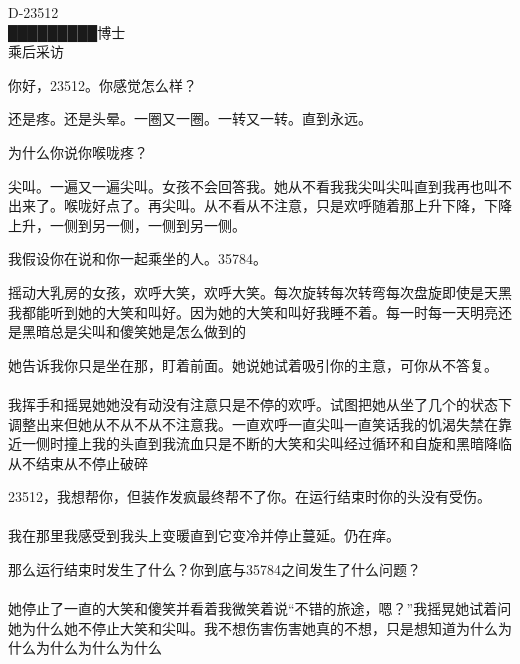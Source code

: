 


\begin{scpbox}

D-23512\\
█████████博士\\
乘后采访\\

你好，23512。你感觉怎么样？

还是疼。还是头晕。一圈又一圈。一转又一转。直到永远。

为什么你说你喉咙疼？

尖叫。一遍又一遍尖叫。女孩不会回答我。她从不看我我尖叫尖叫直到我再也叫不出来了。喉咙好点了。再尖叫。从不看从不注意，只是欢呼随着那上升下降，下降上升，一侧到另一侧，一侧到另一侧。

我假设你在说和你一起乘坐的人。35784。

摇动大乳房的女孩，欢呼大笑，欢呼大笑。每次旋转每次转弯每次盘旋即使是天黑我都能听到她的大笑和叫好。因为她的大笑和叫好我睡不着。每一时每一天明亮还是黑暗总是尖叫和傻笑她是怎么做到的

她告诉我你只是坐在那，盯着前面。她说她试着吸引你的主意，可你从不答复。\\
\\
我挥手和摇晃她她没有动没有注意只是不停的欢呼。试图把她从坐了几个的状态下调整出来但她从不从不从不注意我。一直欢呼一直尖叫一直笑话我的饥渴失禁在靠近一侧时撞上我的头直到我流血只是不断的大笑和尖叫经过循环和自旋和黑暗降临从不结束从不停止破碎

23512，我想帮你，但装作发疯最终帮不了你。在运行结束时你的头没有受伤。\\
\\
我在那里我感受到我头上变暖直到它变冷并停止蔓延。仍在痒。

那么运行结束时发生了什么？你到底与35784之间发生了什么问题？\\
\\
她停止了一直的大笑和傻笑并看着我微笑着说“不错的旅途，嗯？”我摇晃她试着问她为什么她不停止大笑和尖叫。我不想伤害伤害她真的不想，只是想知道为什么为什么为什么为什么为什么

\end{scpbox}
